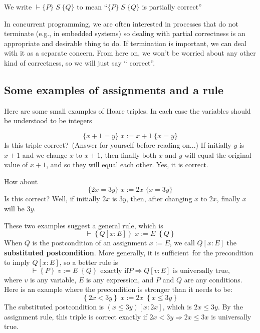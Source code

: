 \documentclass[muchmore,11pt]{article}%
\begin{document}
We write $\vdash\{P\}\;S\;\{Q\}$ to mean \textquotedblleft$\{P\}\;S\;\{Q\}$ is
partially correct\textquotedblright

In concurrent programming, we are often interested in processes that do not
terminate (e.g., in embedded systems) so dealing with partial correctness is
an appropriate and desirable thing to do. If termination is important, we can
deal with it as a separate concern. From here on, we won't be worried about
any other kind of correctness, so we will just say \textquotedblleft
correct\textquotedblright.

\subsection{Some examples of assignments and a rule}

Here are some small examples of Hoare triples. In each case the variables
should be understood to be integers%

\[
\{x+1=y\}\;x:=x+1\;\{x=y\}
\]
Is this triple correct?\ (Answer for yourself before reading on...) If
initially $y$ is $x+1$ and we change $x$ to $x+1$, then finally both $x$ and
$y$ will equal the original value of $x+1$, and so they will equal each other.
Yes, it is correct.

How about%
\[
\{2x=3y\}\;x:=2x\;\{x=3y\}
\]
Is this correct? Well, if initially $2x$ is $3y$, then, after changing $x$ to
$2x$, finally $x$ will be $3y$.

These two examples suggest a general rule, which is%
\[
\vdash\left\{  Q[x:E]\right\}  \;x:=E\;\left\{  Q\right\}
\]
When $Q$ is the postcondition of an assignment $x:=E$, we call $Q[x:E]$ the
\textbf{substituted postcondition}. More generally, it is sufficient\ for the
precondition to imply $Q[x:E]$, so a better rule is%
\[
\vdash\left\{  P\right\}  \;v:=E\;\left\{  Q\right\}  \text{ exactly if
}P\Rightarrow Q[v:E]\text{ is universally true,}%
\]
where $v$ is any variable, $E$ is any expression, and $P$ and $Q$ are any
conditions. Here is an example where the precondition is stronger than it
needs to be:%
\[
\left\{  2x<3y\right\}  \;x:=2x\;\left\{  x\leq3y\right\}
\]
The substituted postcondition is $(x\leq3y)[x:2x]$, which is $2x\leq3y$. By
the assignment rule, this triple is correct exactly if $2x<3y\Rightarrow
2x\leq3x$ is universally true.
\end{document}

